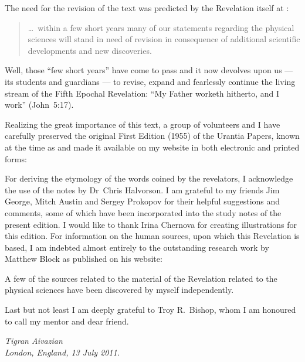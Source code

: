 The need for the revision of the text was predicted by the Revelation itself at :
\begin{quote}
\ldots\ within a few short years many of our statements regarding the physical sciences will stand in need of revision in consequence of additional scientific developments and new discoveries.
\end{quote}
Well, those ``few short years'' have come to pass and it now devolves upon us --- its students and guardians --- to revise,
expand and fearlessly continue the living stream of the Fifth Epochal Revelation:
``My Father worketh hitherto, and I work'' (John~5:17).

Realizing the great importance of this text, a group of volunteers and I have carefully preserved
the original First Edition (1955) of the Urantia Papers, known at the time as 
and made it available on my website in both electronic and printed forms:
\begin{center}\end{center}
For deriving the etymology of the words coined by the revelators, I acknowledge the use of the notes by Dr~Chris Halvorson.
I am grateful to my friends Jim George, Mitch Austin and Sergey Prokopov for their helpful suggestions and comments,
some of which have been incorporated into the study notes of the present edition.
I would like to thank Irina Chernova for creating illustrations for this edition.
For information on the human sources, upon which this Revelation is based, I am indebted almost entirely to the outstanding
research work by Matthew Block as published on his website:
\begin{center}\end{center}
A few of the sources related to the material of the Revelation related to the physical sciences have been discovered by myself
independently.

Last but not least I am deeply grateful to Troy R.~Bishop, whom I am honoured to call my mentor and dear friend.



\begin{flushleft}
\itshape
Tigran Aivazian\\
London, England, 13 July 2011.\\
\end{flushleft}
